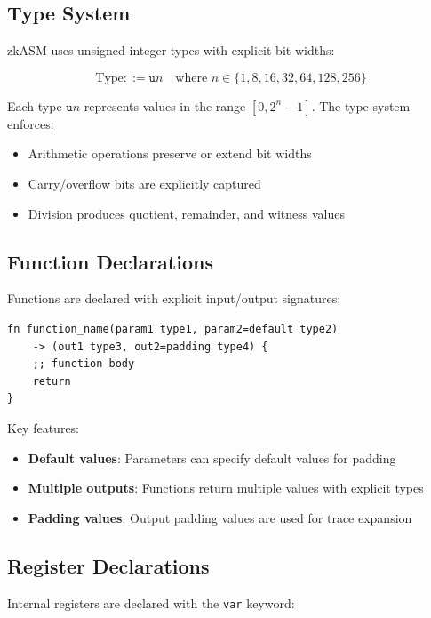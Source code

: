 \documentclass[11pt,a4paper]{article}
\begin{document}
\subsection{Type System}

zkASM uses unsigned integer types with explicit bit widths:

\begin{equation}
\text{Type} ::= \texttt{u}n \quad \text{where } n \in \{1, 8, 16, 32, 64, 128, 256\}
\end{equation}

Each type $\texttt{u}n$ represents values in the range $[0, 2^n - 1]$. The type system enforces:
\begin{itemize}
    \item Arithmetic operations preserve or extend bit widths
    \item Carry/overflow bits are explicitly captured
    \item Division produces quotient, remainder, and witness values
\end{itemize}

\subsection{Function Declarations}

Functions are declared with explicit input/output signatures:

\begin{lstlisting}[style=zkasm,caption={Function Declaration Syntax}]
fn function_name(param1 type1, param2=default type2)
    -> (out1 type3, out2=padding type4) {
    ;; function body
    return
}
\end{lstlisting}

Key features:
\begin{itemize}
    \item \textbf{Default values}: Parameters can specify default values for padding
    \item \textbf{Multiple outputs}: Functions return multiple values with explicit types
    \item \textbf{Padding values}: Output padding values are used for trace expansion
\end{itemize}

\subsection{Register Declarations}

Internal registers are declared with the \texttt{var} keyword:
\end{document}
